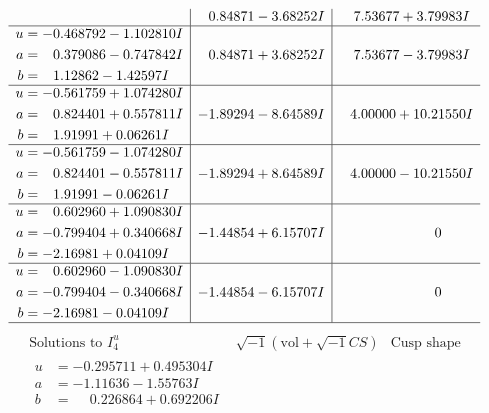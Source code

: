 \documentclass[1p]{elsarticle_modified}
\theoremstyle{definition}
\newcommand{\I}{\sqrt{-1}}
\begin{document}
$$\begin{array}{c|c|c}
 & \phantom{-}0.84871 - 3.68252 I & \phantom{-}7.53677 + 3.79983 I \\ \hline\begin{aligned}
u &= -0.468792 - 1.102810 I \\
a &= \phantom{-}0.379086 - 0.747842 I \\
b &= \phantom{-}1.12862 - 1.42597 I\end{aligned}
 & \phantom{-}0.84871 + 3.68252 I & \phantom{-}7.53677 - 3.79983 I \\ \hline\begin{aligned}
u &= -0.561759 + 1.074280 I \\
a &= \phantom{-}0.824401 + 0.557811 I \\
b &= \phantom{-}1.91991 + 0.06261 I\end{aligned}
 & -1.89294 - 8.64589 I & \phantom{-}4.00000 + 10.21550 I \\ \hline\begin{aligned}
u &= -0.561759 - 1.074280 I \\
a &= \phantom{-}0.824401 - 0.557811 I \\
b &= \phantom{-}1.91991 - 0.06261 I\end{aligned}
 & -1.89294 + 8.64589 I & \phantom{-}4.00000 - 10.21550 I \\ \hline\begin{aligned}
u &= \phantom{-}0.602960 + 1.090830 I \\
a &= -0.799404 + 0.340668 I \\
b &= -2.16981 + 0.04109 I\end{aligned}
 & -1.44854 + 6.15707 I & \phantom{-0.000000 } 0 \\ \hline\begin{aligned}
u &= \phantom{-}0.602960 - 1.090830 I \\
a &= -0.799404 - 0.340668 I \\
b &= -2.16981 - 0.04109 I\end{aligned}
 & -1.44854 - 6.15707 I & \phantom{-0.000000 } 0\\
 \hline 
 \end{array}$$\newpage$$\begin{array}{c|c|c}  
\text{Solutions to }I^u_{4}& \I (\text{vol} + \sqrt{-1}CS) & \text{Cusp shape}\\
 \hline 
\begin{aligned}
u &= -0.295711 + 0.495304 I \\
a &= -1.11636 - 1.55763 I \\
b &= \phantom{-}0.226864 + 0.692206 I\end{aligned}

\end{array}$$
\end{document}

